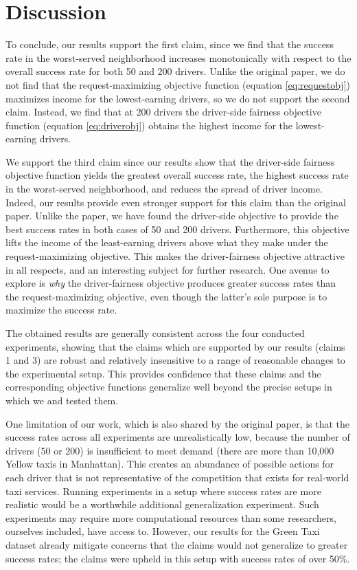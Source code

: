 \section{Discussion}

To conclude, our results support the first claim, since we find that the success rate in the worst-served neighborhood increases monotonically with respect to the overall success rate for both 50 and 200 drivers. Unlike the original paper, we do not find that the request-maximizing objective function (equation \ref{eq:requestobj}) maximizes income for the lowest-earning drivers, so we do not support the second claim. Instead, we find that at 200 drivers the driver-side fairness objective function (equation \ref{eq:driverobj}) obtains the highest income for the lowest-earning drivers.

We support the third claim since our results show that the driver-side fairness objective function yields the greatest overall success rate, the highest success rate in the worst-served neighborhood, and reduces the spread of driver income. Indeed, our results provide even stronger support for this claim than the original paper. Unlike the paper, we have found the driver-side objective to provide the best success rates in both cases of 50 and 200 drivers. Furthermore, this objective lifts the income of the least-earning drivers above what they make under the request-maximizing objective. This makes the driver-fairness objective attractive in all respects, and an interesting subject for further research. One avenue to explore is \textit{why} the driver-fairness objective produces greater success rates than the request-maximizing objective, even though the latter's sole purpose is to maximize the success rate.

The obtained results are generally consistent across the four conducted experiments, showing that the claims which are supported by our results (claims 1 and 3) are robust and relatively insensitive to a range of reasonable changes to the experimental setup. This provides confidence that these claims and the corresponding objective functions generalize well beyond the precise setups in which we and \cite{raman_data-driven_2021} tested them.

One limitation of our work, which is also shared by the original paper, is that the success rates across all experiments are unrealistically low, because the number of drivers (50 or 200) is insufficient to meet demand (there are more than 10,000 Yellow taxis in Manhattan). This creates an abundance of possible actions for each driver that is not representative of the competition that exists for real-world taxi services. Running experiments in a setup where success rates are more realistic would be a worthwhile additional generalization experiment. Such experiments may require more computational resources than some researchers, ourselves included, have access to. However, our results for the Green Taxi dataset already mitigate concerns that the claims would not generalize to greater success rates; the claims were upheld in this setup with success rates of over 50\%.

